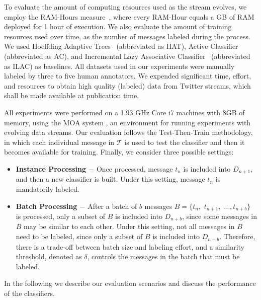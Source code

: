 \documentclass{sig-alternate}
\begin{document}
To evaluate the amount of computing resources used as the stream evolves, we employ the RAM-Hours measure~\cite{Bifet:2010:FPD:2144032.2144069}, where every RAM-Hour equals a GB of RAM deployed for 1 hour of execution. We also evaluate the amount of training resources used over time, as the number of messages labeled during the process. We used Hoeffding Adaptive Trees~\cite{bifetsent1,bifetsent2} (abbreviated as HAT), Active Classifier~\cite{6414645,Indre2011k} (abbreviated as AC), and Incremental Lazy Associative Classifier~\cite{sigir} (abbreviated as ILAC) as baselines. All datasets used in our experiments were manually labeled by three to five human annotators.
We expended significant time, effort,
and resources to obtain high quality (labeled) data from Twitter streams,
which shall be made available at publication time.

All experiments were performed on a 1.93 GHz Core i7 machines with 8GB of memory, using the MOA system \cite{moa}, an environment for running experiments with evolving data streams.
Our evaluation follows the Test-Then-Train methodology, in which 
each individual message in $\mathcal{T}$ is used to test the classifier
and then it becomes available for training.
Finally, we consider three possible settings:
\begin{itemize}
\item{\bf{Instance Processing $-$}}
Once processed, message $t_n$ is included into $D_{n+1}$, and then a new classifier is built. Under this setting, message $t_n$ is mandatorily labeled.
\item{\bf{Batch Processing $-$}}
After a batch of $b$ messages $B=\{t_n,$ $t_{n+1},$ $\ldots, t_{n+b}\}$ is processed, only a subset of $B$ is included into $D_{n+b}$, since some messages in $B$ may be similar to each other. Under this setting, not all messages in $B$ need to be labeled, since only a subset of $B$ is included into $D_{n+b}$. Therefore, there is a trade-off between batch size and labeling effort, and a similarity threshold, denoted as $\delta$, controls the messages in the batch that must be labeled.
\end{itemize}

In the following we describe our evaluation scenarios and discuss the
performance of the classifiers.
\end{document}
